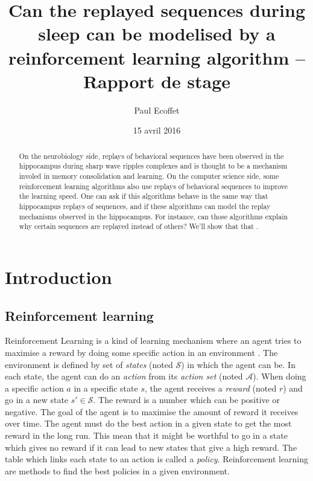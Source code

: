 \documentclass[]{article}
\title{Can the replayed sequences during sleep can be modelised by a reinforcement learning algorithm -- Rapport de stage}
\author{Paul Ecoffet}
\date{15 avril 2016}
\newcommand\bla[1]{\ifthenelse{\isempty{#1}}{\hl{**~bla~bla~**}}{\hl{**~#1~**}}}
\begin{document}
\maketitle

\begin{abstract}
On the neurobiology side, replays of behavioral sequences have been observed in the hippocampus during sharp wave ripples complexes and is thought to be a mechanism involed in memory consolidation and learning. On the computer science side, some reinforcement learning algorithms also use replays of behavioral sequences to improve the learning speed. One can ask if this algorithms behave in the same way that hippocampus replays of sequences, and if these algorithms can model the replay mechanisms observed in the hippocampus. For instance, can those algorithms explain why certain sequences are replayed instead of others? We'll show that that \bla{we'll see}.
\end{abstract}

{
\hypersetup{linkcolor=black}
\setcounter{tocdepth}{3}
}
\section{Introduction}\label{introduction}

\subsection{Reinforcement learning}\label{reinforcement-learning}

Reinforcement Learning is a kind of learning mechanism where an agent tries to maximise a reward by doing some specific action in an environment \parencite{sutton_reinforcement_1998}. The environment is defined by set of \emph{states} (noted \(\mathcal{S}\)) in which the agent can be. In each state, the agent can do an \emph{action} from its \emph{action set} (noted \(\mathcal{A}\)). When doing a specific action \(a\) in a specific state \(s\), the agent receives a \emph{reward} (noted \(r\)) and go in a new state \(s'\in \mathcal{S}\). The reward is a number which can be positive or negative. The goal of the agent is to maximise the amount of reward it receives over time. The agent must do the best action in a given state to get the most reward in the long run. This mean that it might be worthful to go in a state which gives no reward if it can lead to new states that give a high reward. The table which links each state to an action is called a \emph{policy}. Reinforcement learning are methods to find the best policies in a given environment.
\end{document}
